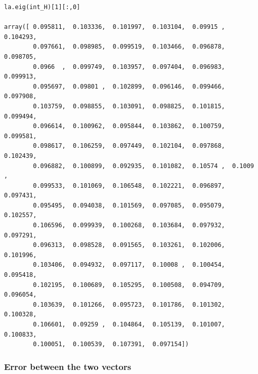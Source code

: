 \begin{verbatim}
la.eig(int_H)[1][:,0]

array([ 0.095811,  0.103336,  0.101997,  0.103104,  0.09915 ,  0.104293,
        0.097661,  0.098985,  0.099519,  0.103466,  0.096878,  0.098705,
        0.0966  ,  0.099749,  0.103957,  0.097404,  0.096983,  0.099913,
        0.095697,  0.09801 ,  0.102899,  0.096146,  0.099466,  0.097908,
        0.103759,  0.098855,  0.103091,  0.098825,  0.101815,  0.099494,
        0.096614,  0.100962,  0.095844,  0.103862,  0.100759,  0.099581,
        0.098617,  0.106259,  0.097449,  0.102104,  0.097868,  0.102439,
        0.096882,  0.100899,  0.092935,  0.101082,  0.10574 ,  0.1009  ,
        0.099533,  0.101069,  0.106548,  0.102221,  0.096897,  0.097431,
        0.095495,  0.094038,  0.101569,  0.097085,  0.095079,  0.102557,
        0.106596,  0.099939,  0.100268,  0.103684,  0.097932,  0.097291,
        0.096313,  0.098528,  0.091565,  0.103261,  0.102006,  0.101996,
        0.103406,  0.094932,  0.097117,  0.10008 ,  0.100454,  0.095418,
        0.102195,  0.100689,  0.105295,  0.100508,  0.094709,  0.096054,
        0.103639,  0.101266,  0.095723,  0.101786,  0.101302,  0.100328,
        0.106601,  0.09259 ,  0.104864,  0.105139,  0.101007,  0.100833,
        0.100051,  0.100539,  0.107391,  0.097154])
\end{verbatim}

\pagebreak

\subsubsection{Error between the two
vectors}\label{error-between-the-two-vectors}

